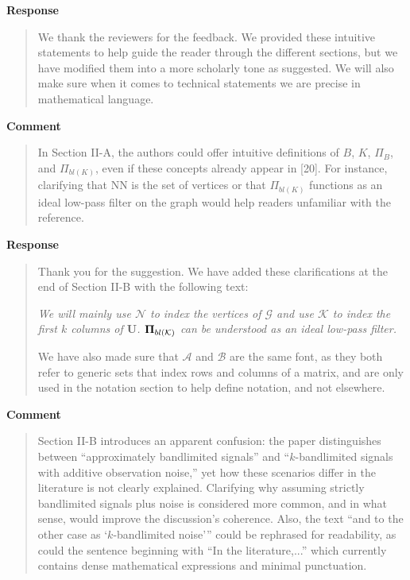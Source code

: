 \documentclass[11pt,onecolumn,journal]{IEEEtran}
\newcommand{\matr}[1]{\bm{#1}}
\theoremstyle{definition}
\newcommand{\set}[1]{\mathcal{#1}}
\begin{document}
\textbf{Response}
\begin{quote}
We thank the reviewers for the feedback. We provided these intuitive statements to help guide the reader through the different sections, but we have modified them into a more scholarly tone as suggested. We will also make sure when it comes to technical statements we are precise in mathematical language.
\end{quote}

\textbf{Comment}
\begin{quote}
In Section II-A, the authors could offer intuitive definitions of $B$, $K$, $\Pi_{B}$, and $\Pi_{bl(K)}$, even if these concepts already appear in [20]. For instance, clarifying that NN is the set of vertices or that $\Pi_{bl(K)}$ functions as an ideal low-pass filter on the graph would help readers unfamiliar with the reference.
\end{quote}

\textbf{Response}
\begin{quote}
Thank you for the suggestion. We have added these clarifications at the end of Section II-B with the following text:

{\it We will mainly use $\set{N}$ to index the vertices of $\set{G}$ and use $\set{K}$ to index the first $k$ columns of $\matr{U}$. $\projbl$ can be understood as an ideal low-pass filter.}

We have also made sure that $\mathcal{A}$ and $\mathcal{B}$ are the same font, as they both refer to generic sets that index rows and columns of a matrix, and are only used in the notation section to help define notation, and not elsewhere.

\end{quote}

\textbf{Comment}
\begin{quote}
Section II-B introduces an apparent confusion: the paper distinguishes between “approximately bandlimited signals” and “$k$-bandlimited signals with additive observation noise,” yet how these scenarios differ in the literature is not clearly explained. Clarifying why assuming strictly bandlimited signals plus noise is considered more common, and in what sense, would improve the discussion’s coherence. Also, the text “and to the other case as ‘$k$-bandlimited noise’” could be rephrased for readability, as could the sentence beginning with “In the literature,...” which currently contains dense mathematical expressions and minimal punctuation.
\end{quote}
\end{document}

